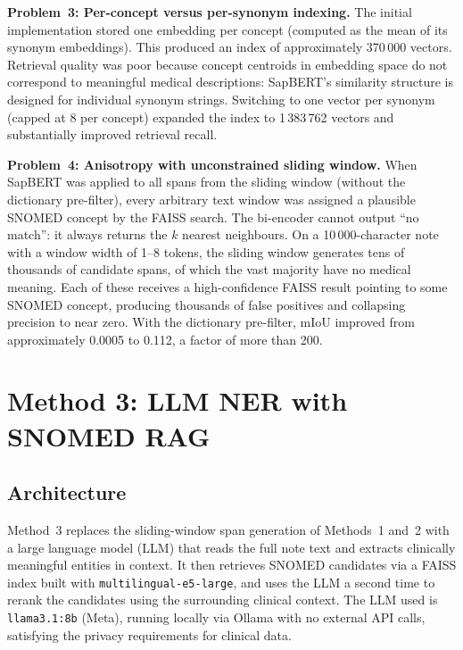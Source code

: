 \textbf{Problem~3: Per-concept versus per-synonym indexing.} The initial implementation stored one embedding per concept (computed as the mean of its synonym embeddings). This produced an index of approximately 370\,000 vectors. Retrieval quality was poor because concept centroids in embedding space do not correspond to meaningful medical descriptions: SapBERT's similarity structure is designed for individual synonym strings. Switching to one vector per synonym (capped at 8 per concept) expanded the index to 1\,383\,762 vectors and substantially improved retrieval recall.

\textbf{Problem~4: Anisotropy with unconstrained sliding window.} When SapBERT was applied to all spans from the sliding window (without the dictionary pre-filter), every arbitrary text window was assigned a plausible SNOMED concept by the FAISS search. The bi-encoder cannot output ``no match'': it always returns the $k$ nearest neighbours. On a 10\,000-character note with a window width of 1--8 tokens, the sliding window generates tens of thousands of candidate spans, of which the vast majority have no medical meaning. Each of these receives a high-confidence FAISS result pointing to some SNOMED concept, producing thousands of false positives and collapsing precision to near zero. With the dictionary pre-filter, mIoU improved from approximately 0.0005 to 0.112, a factor of more than 200.

\section{Method 3: LLM NER with SNOMED RAG}

\subsection{Architecture}

Method~3 replaces the sliding-window span generation of Methods~1 and~2 with a large language model (LLM) that reads the full note text and extracts clinically meaningful entities in context. It then retrieves SNOMED candidates via a FAISS index built with \texttt{multilingual-e5-large}, and uses the LLM a second time to rerank the candidates using the surrounding clinical context. The LLM used is \texttt{llama3.1:8b} (Meta), running locally via Ollama with no external API calls, satisfying the privacy requirements for clinical data. %

